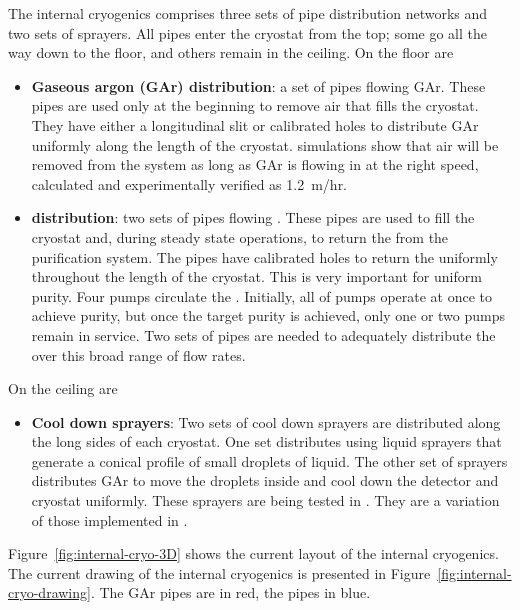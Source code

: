 \label{sec:fdsp-tc-internal-cryo}

The internal cryogenics comprises three sets of pipe distribution networks and two sets of sprayers. All pipes enter the cryostat from the top; some go all the way down to the floor, and others remain in the ceiling. On the floor are
\begin{itemize}
\setlength\itemsep{1mm}
\setlength{\parsep}{1mm}
\setlength{\itemsep}{-5mm}
\item \textbf{Gaseous argon (GAr) distribution}: a set of pipes flowing GAr. These pipes are used only at the beginning to remove air that fills the cryostat. They have either a longitudinal slit or calibrated holes to distribute GAr uniformly along the length of the cryostat.  simulations show that air will be removed from the system as long as GAr is flowing in at the right speed, calculated and experimentally verified as \SI{1.2}{m/hr}.

\item \textbf{ distribution}: two sets of pipes flowing . These pipes are used to fill the cryostat and, during steady state operations, to return the  from the purification system. The pipes have calibrated holes to return the  uniformly throughout the length of the cryostat. This is very important for uniform purity. Four pumps circulate the . Initially, all of pumps operate at once to achieve purity, but once the target purity is achieved, only one or two pumps remain in service. Two sets of pipes are needed to adequately distribute the  over this broad range of flow rates.
\end{itemize}

On the ceiling are

\begin{itemize}
\setlength\itemsep{1mm}
\setlength{\parsep}{1mm}
\setlength{\itemsep}{-5mm}
\item \textbf{Cool down sprayers}: Two sets of cool down sprayers are distributed along the long sides of each cryostat. One set distributes  using liquid sprayers that generate a conical profile of small droplets of liquid. The other set of sprayers distributes GAr to move the  droplets inside and cool down the detector and cryostat uniformly. These sprayers are being tested in . They are a variation of those implemented in .
\end{itemize}

Figure~\ref{fig:internal-cryo-3D} shows the current layout of the internal cryogenics. The current drawing of the internal cryogenics is presented in Figure~\ref{fig:internal-cryo-drawing}. The GAr pipes are in red, the  pipes in blue.

